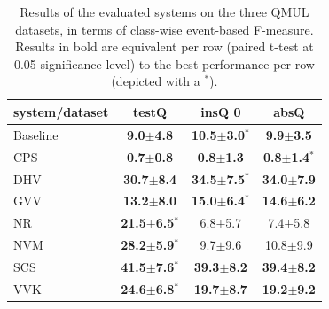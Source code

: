 \begin{table} 
\begin{center}  
\begin{tabular}{lccc}  
system/dataset & testQ & insQ 0 & absQ \\ 
\hline 
Baseline & \textbf{ 9.0$\pm$4.8}     & \textbf{10.5$\pm$3.0$^*$}   & \textbf{ 9.9$\pm$3.5} \\ 
CPS      & \textbf{0.7$\pm$0.8}      & \textbf{0.8$\pm$1.3}        & \textbf{0.8$\pm$1.4$^*$} \\ 
DHV      & \textbf{30.7$\pm$8.4}     & \textbf{34.5$\pm$7.5$^*$}   & \textbf{34.0$\pm$7.9} \\ 
GVV      & \textbf{13.2$\pm$8.0}     & \textbf{15.0$\pm$6.4$^*$}   & \textbf{14.6$\pm$6.2} \\ 
NR       & \textbf{21.5$\pm$6.5$^*$} &  6.8$\pm$5.7                &  7.4$\pm$5.8 \\ 
NVM      & \textbf{28.2$\pm$5.9$^*$} &  9.7$\pm$9.6                & 10.8$\pm$9.9 \\ 
SCS      & \textbf{41.5$\pm$7.6$^*$} & \textbf{39.3$\pm$8.2}       & \textbf{39.4$\pm$8.2} \\ 
VVK      & \textbf{24.6$\pm$6.8$^*$} & \textbf{19.7$\pm$8.7}       & \textbf{19.2$\pm$9.2} \\  
\hline
\end{tabular} 
\end{center} 
\caption{Results of the evaluated systems on the three QMUL datasets, in terms of class-wise event-based F-measure. Results in bold are equivalent per row (paired t-test at 0.05 significance level) to the best performance per row (depicted with a $^*$).} 
\label{tab:qmul} 
\end{table} 

